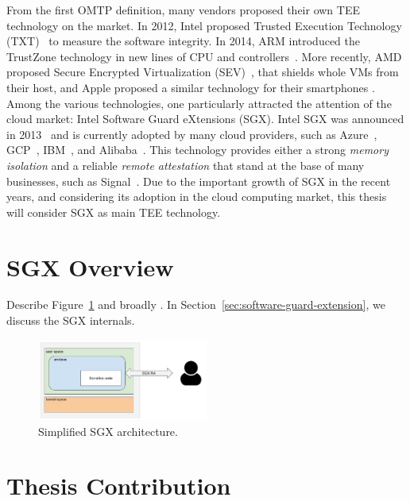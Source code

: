 From the first OMTP definition, many vendors proposed their own TEE technology 
on the market.
In 2012, Intel proposed  Trusted Execution Technology 
(TXT)~\citep{greene2012intel} to measure the software integrity.
In 2014, ARM introduced the TrustZone technology in new lines of CPU and 
controllers~\citep{arm-trustzone}. 
More recently, AMD proposed Secure Encrypted Virtualization 
(SEV)~\citep{amdsev}, that shields whole VMs from their host, and 
Apple proposed a similar technology for their smartphones \citep{apple-enclave}.
Among the various technologies, one particularly attracted the attention of the 
cloud market: Intel Software Guard eXtensions (SGX).
Intel SGX was announced in 2013~\citep{rozas2013intel} and is currently adopted 
by many cloud providers, such as Azure~\citep{azure}, 
GCP~\citep{challita2018precise}, IBM~\citep{IBM}, and 
Alibaba~\citep{alibabasgx}.
This technology provides either a strong \emph{memory isolation} and a reliable 
\emph{remote attestation} that stand at the base of many businesses, such as 
Signal~\citep{signal}.
Due to the important growth of SGX in the recent years, and considering its 
adoption in the cloud computing market, this thesis will consider SGX as main 
TEE technology.

\section{SGX Overview}

Describe Figure~\ref{fig:sgx-architecture} and broadly .
In Section~\ref{sec:software-guard-extension}, we discuss the SGX internals.

\begin{figure}[t]
	\centering
	\includegraphics[width=0.5\textwidth]{fig_c1/sgx-architecture.pdf}
	\caption[SGX architecture.]{Simplified SGX architecture.}
	\label{fig:sgx-architecture}
\end{figure}

\section{Thesis Contribution}


